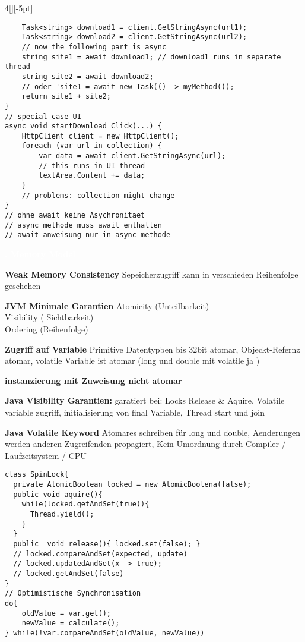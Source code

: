 \documentclass[%
	pdftex,%
	a4paper,%
	landscape,%
	ngerman,
	oneside,%
	6pt,%
	halfparskip,%
]{scrbook}
\newenvironment{mainbox}{%
  \def\FrameCommand{\fboxrule 1px \fcolorbox{black}{spec_blue}}%
  \MakeFramed {\advance\hsize-\width \FrameRestore}}%
 {\endMakeFramed}
\newcommand{\maintopic}[1]{\setcounter{subtopicenum}{0}\setcounter{subsubtopicenum}{0}\vspace{-4px}\begin{mainbox}\textcolor{white}{\textbf{\large{\stepcounter{maintopicenum}\Roman{maintopicenum}. #1}}}\end{mainbox}\vspace{-4px}}
\newenvironment{tight-itemize}
{ \begin{itemize}
    \setlength{\itemsep}{0px}
    \setlength{\parskip}{0px}
    \setlength{\parsep}{0px}  }
{ \end{itemize}                  }
\begin{document}
\begin{multicols}{4}[][-5pt]
\begin{lstlisting}
    Task<string> download1 = client.GetStringAsync(url1);
    Task<string> download2 = client.GetStringAsync(url2);
    // now the following part is async
    string site1 = await download1; // download1 runs in separate thread
    string site2 = await download2;
    // oder 'site1 = await new Task(() -> myMethod());
    return site1 + site2;
}
// special case UI
async void startDownload_Click(...) {
    HttpClient client = new HttpClient();
    foreach (var url in collection) {
        var data = await client.GetStringAsync(url);
        // this runs in UI thread
        textArea.Content += data;
    }
    // problems: collection might change 
}
// ohne await keine Asychronitaet
// async methode muss await enthalten
// await anweisung nur in async methode
\end{lstlisting}
\maintopic{Memory Model}
\begin{tight-itemize}
    \item{\textbf{Weak Memory Consistency} Sepeicherzugriff kann in verschieden Reihenfolge geschehen}
    \item{\textbf{JVM Minimale Garantien} Atomicity (Unteilbarkeit) \\ Visibility ( Sichtbarkeit) 
        \\ Ordering (Reihenfolge)}
    \item{\textbf{Zugriff auf Variable} Primitive Datentypben bis 32bit atomar, Objeckt-Refernz atomar, volatile Variable ist atomar (long und double mit volatile ja )}
    \item{\textbf{instanzierung mit Zuweisung nicht atomar} }
    \item{\textbf{Java Visibility Garantien:} garatiert bei: Locks Release \& Aquire, Volatile variable zugriff, initialisierung von final Variable, Thread start und join }
    \item{\textbf{Java Volatile Keyword} Atomares schreiben für long und double, Aenderungen werden anderen Zugreifenden propagiert, Kein Umordnung durch Compiler / Laufzeitsystem / CPU}
\end{tight-itemize}
\begin{lstlisting}
class SpinLock{
  private AtomicBoolean locked = new AtomicBoolena(false);
  public void aquire(){
    while(locked.getAndSet(true)){
      Thread.yield();
    }
  }
  public  void release(){ locked.set(false); }
  // locked.compareAndSet(expected, update)
  // locked.updatedAndGet(x -> true);
  // locked.getAndSet(false)
}
// Optimistische Synchronisation
do{
    oldValue = var.get();
    newValue = calculate();
} while(!var.compareAndSet(oldValue, newValue))

\end{lstlisting}
\end{multicols}
\end{document}
